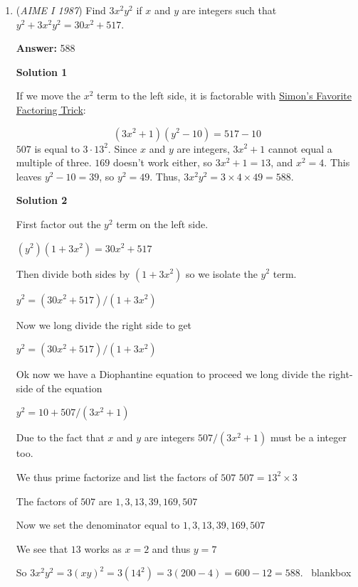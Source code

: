 \begin{enumerate}
 Simply double the area and we get $\boxed{480}$ as our final answer.~hastapasta

 


	\item (\textit{AIME I 1987}) Find $3x^2 y^2$ if $x$ and $y$ are integers such that $y^2 + 3x^2 y^2 = 30x^2 + 517$.


 
 \textbf{Answer: }588



\textbf{Solution 1}

If we move the $x^2$ term to the left side, it is factorable with \href{https://artofproblemsolving.com/wiki/index.php?title=SFFT}{Simon's Favorite Factoring Trick}:

 
 \[(3x^2 + 1)(y^2 - 10) = 517 - 10\]
$507$ is equal to $3 \cdot 13^2$. Since $x$ and $y$ are integers, $3x^2 + 1$ cannot equal a multiple of three. $169$ doesn't work either, so $3x^2 + 1 = 13$, and $x^2 = 4$. This leaves $y^2 - 10 = 39$, so $y^2 = 49$. Thus, $3x^2 y^2 = 3 \times 4 \times 49 = \boxed{588}$.

 



\textbf{Solution 2}

First factor out the $y^2$ term on the left side. 

 $(y^2)(1+3x^2) = 30x^2 + 517$ 

 Then divide both sides by $(1+3x^2)$ so we isolate the $y^2$ term.

 $y^2 = (30x^2 + 517)/(1+3x^2)$

 Now we long divide the right side to get

 $y^2 = (30x^2 + 517)/(1+3x^2)$

 Ok now we have a Diophantine equation to proceed we long divide the right-side of the equation

 $y^2 = 10 + 507/(3x^2 + 1)$

 Due to the fact that $x$ and $y$ are integers $507/(3x^2 + 1)$ must be a integer too.

 We thus prime factorize and list the factors of $507$
$507 = 13^2 \times 3$

 The factors of $507$ are $1, 3, 13, 39, 169, 507$

 Now we set the denominator equal to $1, 3, 13, 39, 169, 507$

 We see that $13$ works as $x = 2$ and thus $y = 7$

 So $3x^2 y^2 = 3(xy)^2 = 3(14^2) = 3(200 - 4) = 600-12 = \boxed{588}$. ~blankbox


\end{enumerate}
